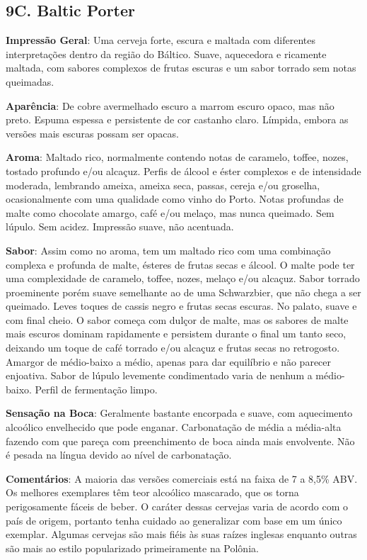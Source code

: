 \subsection*{9C. Baltic Porter}
\textbf{Impressão Geral}: Uma cerveja forte, escura e maltada com diferentes interpretações dentro da região do Báltico. Suave, aquecedora e ricamente maltada, com sabores complexos de frutas escuras e um sabor torrado sem notas queimadas.

\textbf{Aparência}: De cobre avermelhado escuro a marrom escuro opaco, mas não preto. Espuma espessa e persistente de cor castanho claro. Límpida, embora as versões mais escuras possam ser opacas.

\textbf{Aroma}: Maltado rico, normalmente contendo notas de caramelo, toffee, nozes, tostado profundo e/ou alcaçuz. Perfis de álcool e éster complexos e de intensidade moderada, lembrando ameixa, ameixa seca, passas, cereja e/ou groselha, ocasionalmente com uma qualidade como vinho do Porto. Notas profundas de malte como chocolate amargo, café e/ou melaço, mas nunca queimado. Sem lúpulo. Sem acidez. Impressão suave, não acentuada.

\textbf{Sabor}: Assim como no aroma, tem um maltado rico com uma combinação complexa e profunda de malte, ésteres de frutas secas e álcool. O malte pode ter uma complexidade de caramelo, toffee, nozes, melaço e/ou alcaçuz. Sabor torrado proeminente porém suave semelhante ao de uma Schwarzbier, que não chega a ser queimado. Leves toques de cassis negro e frutas secas escuras. No palato, suave e com final cheio. O sabor começa com dulçor de malte, mas os sabores de malte mais escuros dominam rapidamente e persistem durante o final um tanto seco, deixando um toque de café torrado e/ou alcaçuz e frutas secas no retrogosto. Amargor de médio-baixo a médio, apenas para dar equilíbrio e não parecer enjoativa. Sabor de lúpulo levemente condimentado varia de nenhum a médio-baixo. Perfil de fermentação limpo.

\textbf{Sensação na Boca}: Geralmente bastante encorpada e suave, com aquecimento alcoólico envelhecido que pode enganar. Carbonatação de média a média-alta fazendo com que pareça com preenchimento de boca ainda mais envolvente. Não é pesada na língua devido ao nível de carbonatação.

\textbf{Comentários}: A maioria das versões comerciais está na faixa de 7 a 8,5\% ABV. Os melhores exemplares têm teor alcoólico mascarado, que os torna perigosamente fáceis de beber. O caráter dessas cervejas varia de acordo com o país de origem, portanto tenha cuidado ao generalizar com base em um único exemplar. Algumas cervejas são mais fiéis às suas raízes inglesas enquanto outras são mais ao estilo popularizado primeiramente na Polônia.

